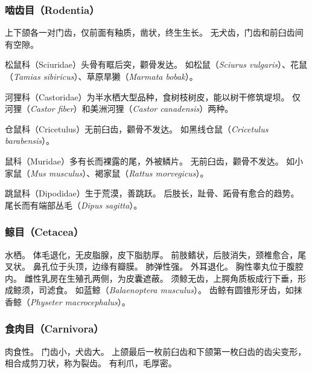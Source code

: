 \documentclass[11pt]{article}
\begin{document}
\subsubsection{啮齿目（Rodentia）}
上下颌各一对门齿，仅前面有釉质，凿状，终生生长。
无犬齿，门齿和前臼齿间有空隙。

\newline

松鼠科（Sciuridae）头骨有眶后突，颧骨发达。
如松鼠（\textit{Sciurus vulgaris}）、花鼠（\textit{Tamias sibiricus}）、草原旱獭（\textit{Marmata bobak}）。

\newline

河狸科（Castoridae）为半水栖大型品种，食树枝树皮，能以树干修筑堤坝。
仅河狸（\textit{Castor fiber}）和美洲河狸（\textit{Castor canadensis}）两种。

\newline

仓鼠科（Cricetulus）无前臼齿，颧骨不发达。
如黑线仓鼠（\textit{Cricetulus barabensis}）。

\newline

鼠科（Muridae）多有长而裸露的尾，外被鳞片。
无前臼齿，颧骨不发达。
如小家鼠（\textit{Mus musculus}）、褐家鼠（\textit{Rattus morvegicus}）。

\newline

跳鼠科（Dipodidae）生于荒漠，善跳跃。
后肢长，趾骨、跖骨有愈合的趋势。
尾长而有端部丛毛（\textit{Dipus sagitta}）。

\subsubsection{鲸目（Cetacea）}
水栖。
体毛退化，无皮脂腺，皮下脂肪厚。
前肢鳍状，后肢消失，颈椎愈合，尾叉状。
鼻孔位于头顶，边缘有瓣膜。
肺弹性强。
外耳退化。
胸性睾丸位于腹腔内。
雌性乳房在生殖孔两侧，为皮囊遮蔽。
须鲸无齿，上腭角质板成行下垂，形成鲸须，司滤食。
如蓝鲸（\textit{Balaenoptera musculus}）。
齿鲸有圆锥形牙齿，如抹香鲸（\textit{Physeter macrocephalus}）。

\subsubsection{食肉目（Carnivora）}
肉食性。
门齿小，犬齿大。
上颌最后一枚前臼齿和下颌第一枚臼齿的齿尖变形，相合成剪刀状，称为裂齿。
有利爪，毛厚密。

\newline
\end{document}
